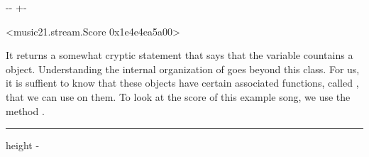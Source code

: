 \documentclass[letterpaper,10pt,english]{sphinxmanual}
\newlength\nbsphinxcodecellspacing
\begin{document}
{
\begin{sphinxVerbatim}[commandchars=\\\{\}]
\llap{\color{nbsphinxin}[17]:\,\hspace{\fboxrule}\hspace{\fboxsep}}
\end{sphinxVerbatim}
}

{

\kern-\sphinxverbatimsmallskipamount\kern-\baselineskip
\kern+\FrameHeightAdjust\kern-\fboxrule
\vspace{\nbsphinxcodecellspacing}

\begin{sphinxVerbatim}[commandchars=\\\{\}]
\llap{\color{nbsphinxout}[17]:\,\hspace{\fboxrule}\hspace{\fboxsep}}<music21.stream.Score 0x1e4e4ea5a00>
\end{sphinxVerbatim}
}

It returns a somewhat cryptic statement that says that the variable countains a  object. Understanding the internal organization of  goes beyond this class. For us, it is suffient to know that these objects have certain associated functions, called , that we can use on them. To look at the score of this example song, we use the method .

{
\begin{sphinxVerbatim}[commandchars=\\\{\}]
\llap{\color{nbsphinxin}[18]:\,\hspace{\fboxrule}\hspace{\fboxsep}}
\end{sphinxVerbatim}
}

\hrule height -\fboxrule\relax
\vspace{\nbsphinxcodecellspacing}

\makeatletter\setbox\nbsphinxpromptbox\box\voidb@x\makeatother
\end{document}
